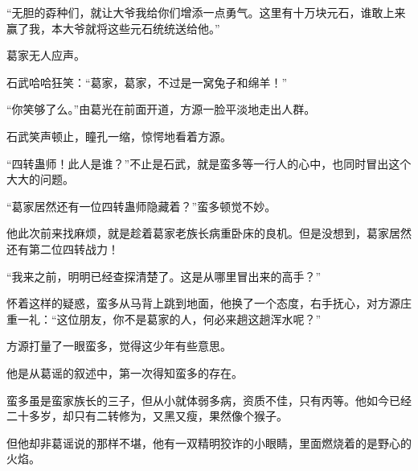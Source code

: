 \begin{this_body}
“无胆的孬种们，就让大爷我给你们增添一点勇气。这里有十万块元石，谁敢上来赢了我，本大爷就将这些元石统统送给他。”

葛家无人应声。

石武哈哈狂笑：“葛家，葛家，不过是一窝兔子和绵羊！”

“你笑够了么。”由葛光在前面开道，方源一脸平淡地走出人群。

石武笑声顿止，瞳孔一缩，惊愕地看着方源。

“四转蛊师！此人是谁？”不止是石武，就是蛮多等一行人的心中，也同时冒出这个大大的问题。

“葛家居然还有一位四转蛊师隐藏着？”蛮多顿觉不妙。

他此次前来找麻烦，就是趁着葛家老族长病重卧床的良机。但是没想到，葛家居然还有第二位四转战力！

“我来之前，明明已经查探清楚了。这是从哪里冒出来的高手？”

怀着这样的疑惑，蛮多从马背上跳到地面，他换了一个态度，右手抚心，对方源庄重一礼：“这位朋友，你不是葛家的人，何必来趟这趟浑水呢？”

方源打量了一眼蛮多，觉得这少年有些意思。

他是从葛谣的叙述中，第一次得知蛮多的存在。

蛮多虽是蛮家族长的三子，但从小就体弱多病，资质不佳，只有丙等。他如今已经二十多岁，却只有二转修为，又黑又瘦，果然像个猴子。

但他却非葛谣说的那样不堪，他有一双精明狡诈的小眼睛，里面燃烧着的是野心的火焰。

\end{this_body}

